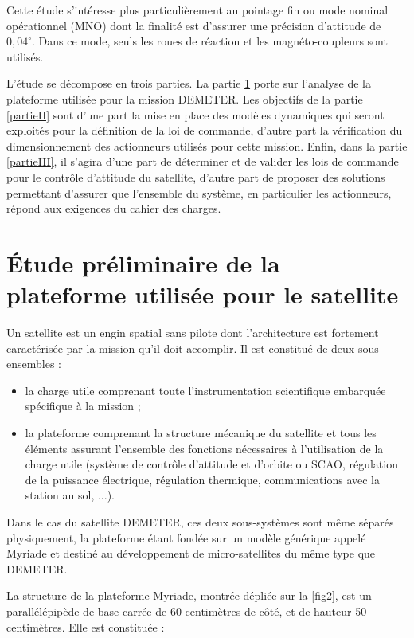 Cette étude s'intéresse plus particulièrement au pointage fin ou mode
nominal opérationnel (MNO) dont la finalité est d'assurer une précision
d'attitude de $0,04^{\circ}$. Dans ce mode, seuls les roues de réaction et les
magnéto-coupleurs sont utilisés.

L'étude se décompose en trois parties. La partie \ref{partieI} porte sur l'analyse
de la plateforme utilisée pour la mission DEMETER. Les objectifs de la
partie \ref{partieII} sont d'une part la mise en place des modèles dynamiques qui
seront exploités pour la définition de la loi de commande, d'autre part
la vérification du dimensionnement des actionneurs utilisés pour cette
mission. Enfin, dans la partie \ref{partieIII}, il s'agira d'une part de déterminer
et de valider les lois de commande pour le contrôle d'attitude du
satellite, d'autre part de proposer des solutions permettant d'assurer
que l'ensemble du système, en particulier les actionneurs, répond aux
exigences du cahier des charges.

\fi
\section{Étude préliminaire de la plateforme utilisée pour le satellite}\label{partieI}

\ifprof
\else
Un satellite est un engin spatial sans pilote dont l'architecture est
fortement caractérisée par la mission qu'il doit accomplir. Il est
constitué de deux sous-ensembles :

\begin{itemize}
\item la charge utile comprenant toute l'instrumentation scientifique
  embarquée spécifique à la mission ;
\item la plateforme comprenant la structure mécanique du satellite et tous
  les éléments assurant l'ensemble des fonctions nécessaires à
  l'utilisation de la charge utile (système de contrôle d'attitude et
  d'orbite ou SCAO, régulation de la puissance électrique, régulation
  thermique, communications avec la station au sol, ...).
\end{itemize}

Dans le cas du satellite DEMETER, ces deux sous-systèmes sont même
séparés physiquement, la plateforme étant fondée sur un modèle générique
appelé Myriade et destiné au développement de micro-satellites du même
type que DEMETER.

La structure de la plateforme Myriade, montrée dépliée sur la
\autoref{fig2}, est un parallélépipède de base carrée de 60
centimètres de côté, et de hauteur 50 centimètres. Elle est constituée :

